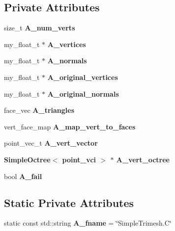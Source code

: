 \subsection*{Private Attributes}
\begin{CompactItemize}
\item 
size\_\-t \textbf{A\_\-num\_\-verts}\label{classSimSite3D_1_1SimpleTrimesh_6a22833ec49ae22b4bcae565ab506ee7}

\item 
my\_\-float\_\-t $\ast$ \textbf{A\_\-vertices}\label{classSimSite3D_1_1SimpleTrimesh_0b2728defec0b9891a7d0994e18409a5}

\item 
my\_\-float\_\-t $\ast$ \textbf{A\_\-normals}\label{classSimSite3D_1_1SimpleTrimesh_ad00478d9a636db9bfebaaa231af324a}

\item 
my\_\-float\_\-t $\ast$ \textbf{A\_\-original\_\-vertices}\label{classSimSite3D_1_1SimpleTrimesh_f6d1e2ff40b5128807071b875f9ed5a3}

\item 
my\_\-float\_\-t $\ast$ \textbf{A\_\-original\_\-normals}\label{classSimSite3D_1_1SimpleTrimesh_8b4de78334d1f9d9000736d1a4dd136b}

\item 
face\_\-vec \textbf{A\_\-triangles}\label{classSimSite3D_1_1SimpleTrimesh_5c348cc0d69688bc23fabb76b264761f}

\item 
vert\_\-face\_\-map \textbf{A\_\-map\_\-vert\_\-to\_\-faces}\label{classSimSite3D_1_1SimpleTrimesh_a32acc842c22b1302bde419ff1d5eb5a}

\item 
point\_\-vec\_\-t \textbf{A\_\-vert\_\-vector}\label{classSimSite3D_1_1SimpleTrimesh_26be812cfc1a68392a84acff308cb0d1}

\item 
\bf{Simple\-Octree}$<$ point\_\-vci $>$ $\ast$ \textbf{A\_\-vert\_\-octree}\label{classSimSite3D_1_1SimpleTrimesh_00784171656f6854854ac59e66946560}

\item 
bool \textbf{A\_\-fail}\label{classSimSite3D_1_1SimpleTrimesh_06ae2ea910eb94d50838f28e88b39949}

\end{CompactItemize}
\subsection*{Static Private Attributes}
\begin{CompactItemize}
\item 
static const std::string \textbf{A\_\-fname} = \char`\"{}Simple\-Trimesh.C\char`\"{}\label{classSimSite3D_1_1SimpleTrimesh_280c7e3491eb35295f8f5bd38e2213d5}

\end{CompactItemize}
